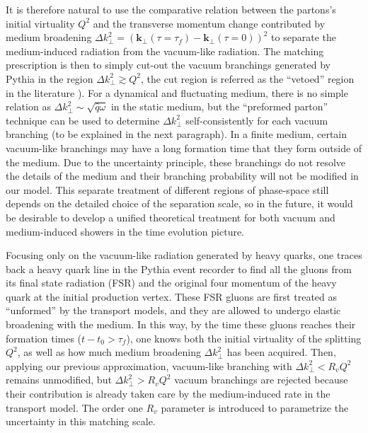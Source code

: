 It is therefore natural to use the comparative relation between the partons's initial virtuality $Q^2$ and the transverse momentum change contributed by medium broadening $\Delta k_\perp^2 = (\mathbf{k}_\perp(\tau=\tau_f) - \mathbf{k}_\perp(\tau=0))^2$ to separate the medium-induced radiation from the vacuum-like radiation.
The matching prescription is then to simply cut-out the vacuum branchings generated by Pythia in the region $\Delta k_\perp^2 \gtrsim Q^2$, the cut region is referred as the ``vetoed'' region in the literature \cite{PhysRevLett.120.232001}).
For a dynamical and fluctuating medium, there is no simple relation as $\Delta k_\perp^2\sim \sqrt{\hat{q}\omega}$ in the static medium, but the ``preformed parton'' technique can be used to determine $\Delta k_\perp^2$ self-consistently for each vacuum branching (to be explained in the next paragraph).
In a finite medium, certain vacuum-like branchings may have a long formation time that they form outside of the medium.
Due to the uncertainty principle, these branchings do not resolve the details of the medium and their branching probability will not be modified in our model.
This separate treatment of different regions of phase-space still depends on the detailed choice of the separation scale, so in the future, it would be desirable to develop a unified theoretical treatment for both vacuum and medium-induced showers in the time evolution picture.

Focusing only on the vacuum-like radiation generated by heavy quarks, one traces back a heavy quark line in the Pythia event recorder to find all the gluons from its final state radiation (FSR) and the original four momentum of the heavy quark at the initial production vertex.
These FSR gluons are first treated as ``unformed'' by the transport models, and they are allowed to undergo elastic broadening with the medium.
In this way, by the time these gluons reaches their formation times ($t-t_0>\tau_f$), one knows both the initial virtuality of the splitting $Q^2$, as well as how much medium broadening $\Delta k_\perp^2$ has been acquired.
Then, applying our previous approximation, vacuum-like branching with 
$\Delta k_\perp^2 < R_v Q^2$ remains unmodified, but $\Delta k_\perp^2 > R_v Q^2$ vacuum branchings are rejected because their contribution is already taken care by the medium-induced rate in the transport model.
The order one $R_v$ parameter is introduced to parametrize the uncertainty in this matching scale.

